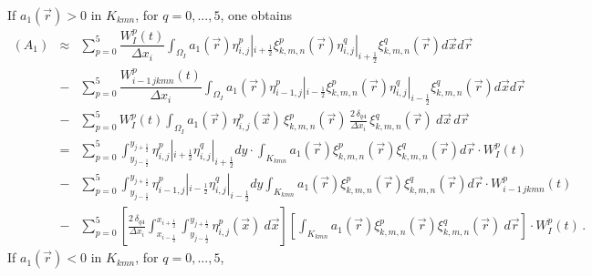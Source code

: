 \documentclass[11pt]{article}
\newcommand{\ot}{\frac{1}{2}}
\begin{document}
If $a_{1}(\vec{r}) > 0 $ in $K_{kmn}$, for $q = 0,...,5$, one obtains
{\small
\begin{eqnarray*}
(A_{1}) & \approx &
\sum_{p=0}^{5} 
\dfrac{W_{I}^p (t)}{\Delta x_{i}}
\int_{\Omega_{I}} 
a_{1}(\vec{r})  \eta^{p}_{i,j}|_{i + \ot}  \xi^{p}_{k,m,n}(\vec{r}) 
\eta^{q}_{i,j}|_{i + \ot} \xi^{q}_{k,m,n}(\vec{r}) 
d\vec{x} d\vec{r}
\\
& - &
\sum_{p=0}^{5} 
\dfrac{W_{i-1 \, jkmn}^p (t)}{\Delta x_{i}}
\int_{\Omega_{I}} 
a_{1}(\vec{r})  \eta^{p}_{i-1,j}|_{i - \ot}  \xi^{p}_{k,m,n}(\vec{r}) 
\eta^{q}_{i,j}|_{i - \ot} \xi^{q}_{k,m,n}(\vec{r}) 
d\vec{x} d\vec{r}
\\
& - &
\sum_{p=0}^{5} W_{I}^p (t)
\int_{\Omega_{I}}
a_{1}(\vec{r}) \, \eta^{p}_{i,j}(\vec{x}) \, \xi^{p}_{k,m,n}(\vec{r}) \,
\frac{2 \, \delta_{q 4}}{\Delta x_{i}} \, \xi^{q}_{k,m,n}(\vec{r}) \: 
d\vec{x} \, d\vec{r}  
\\
& = &
\sum_{p=0}^{5} 
\int_{y_{j - \ot}}^{y_{j + \ot}}
  \eta^{p}_{i,j}|_{i + \ot} \eta^{q}_{i,j}|_{i + \ot}  dy
\cdot
\int_{K_{kmn}}
a_{1}(\vec{r}) \xi^{p}_{k,m,n}(\vec{r}) 
 \xi^{q}_{k,m,n}(\vec{r}) d\vec{r}
\cdot
W_{I}^p (t)
\\
& - &
\sum_{p=0}^{5} 
\int_{y_{j - \ot}}^{y_{j + \ot}}
 \eta^{p}_{i-1,j}|_{i - \ot} \eta^{q}_{i,j}|_{i - \ot} dy
\int_{K_{kmn}}
a_{1}(\vec{r}) \xi^{p}_{k,m,n}(\vec{r}) 
 \xi^{q}_{k,m,n}(\vec{r}) d\vec{r}
\cdot
W_{i-1 \, jkmn}^p(t)
\\
& - &
\sum_{p=0}^{5} 
\left[ 
\frac{2 \, \delta_{q 4}}{\Delta x_{i}}
\int_{x_{i - \ot}}^{x_{i + \ot}}
\int_{y_{j - \ot}}^{y_{j + \ot}}
 \eta^{p}_{i,j}(\vec{x}) \:d\vec{x}
\right] 
\left[ 
\int_{K_{kmn}}
a_{1}(\vec{r}) \xi^{p}_{k,m,n}(\vec{r}) 
 \xi^{q}_{k,m,n}(\vec{r}) \: d\vec{r}
\right] 
\cdot
W_{I}^p (t) \, .
\end{eqnarray*}
}
%
%
If $a_{1}(\vec{r}) < 0 $ in $ K_{kmn}$, for $q = 0,...,5$, 
\end{document}
